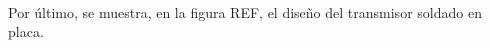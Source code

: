\paragraph{}
Por último, se muestra, en la figura REF, el diseño del transmisor soldado en placa.
% 
% 
